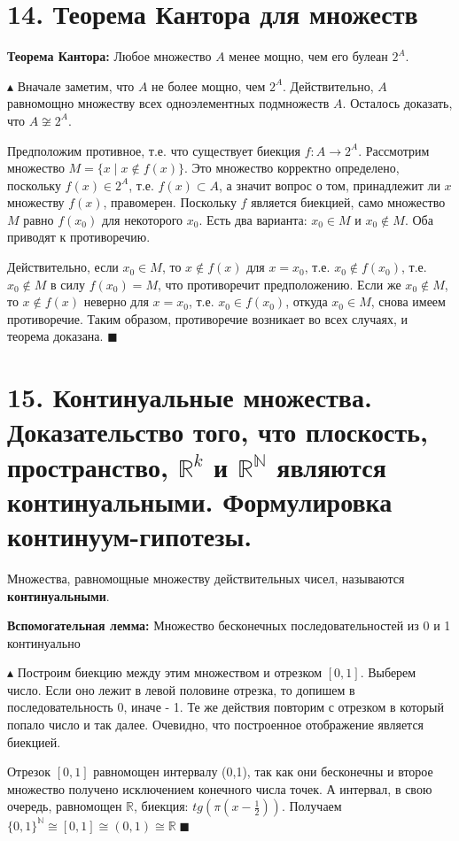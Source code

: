 \section*{14. Теорема Кантора для множеств}
\par \textbf{Теорема Кантора:} Любое множество $A$ менее мощно, чем его булеан $2^A$.
\par $\blacktriangle$ Вначале заметим, что $A$ не более мощно, чем $2^A$. Действительно, $A$ равномощно множеству всех одноэлементных подмножеств $A$. Осталось доказать, что $A \not\cong 2^A$.
\par Предположим противное, т.е. что существует биекция $f : A \rightarrow 2^A$. Рассмотрим множество $M = \{x \; | \; x \not\in f(x)\}$. Это множество корректно определено, поскольку $f(x) \in 2^A$, т.е. $f(x) \subset A$, а значит вопрос о том, принадлежит ли $x$ множеству $f(x)$, правомерен.
Поскольку $f$ является биекцией, само множество $M$ равно $f(x_0)$ для некоторого $x_0$.
Есть два варианта: $x_0 \in M$ и $x_0 \not\in M$. Оба приводят к противоречию.
\par Действительно, если $x_0 \in M$, то $x \not\in f(x)$ для $x = x_0$, т.е. $x_0 \not\in f(x_0)$, т.е. $x_0 \not\in M$ в силу $f(x_0) = M$, что противоречит предположению. Если же $x_0 \not\in M$, то $x \not\in f(x)$
неверно для $x = x_0$, т.е. $x_0 \in f(x_0)$, откуда $x_0 \in M$, снова имеем противоречие. Таким образом, противоречие возникает во всех случаях, и теорема доказана. $\blacksquare$

\section*{15. Континуальные множества. Доказательство того, что плоскость, пространство, $\mathbb{R}^k$ и $\mathbb{R}^{\mathbb{N}}$ являются континуальными. Формулировка \\ континуум-гипотезы.}
\par Множества, равномощные множеству действительных чисел, называются \textbf{континуальными}.
\par \textbf{Вспомогательная лемма: } Множество бесконечных последовательностей из 0 и 1 континуально
\par $\blacktriangle$ Построим биекцию между этим множеством и отрезком $[0,1]$. Выберем число. Если оно лежит в левой половине отрезка, то допишем в последовательность 0, иначе - 1. Те же действия повторим с отрезком в который попало число и так далее. Очевидно, что построенное отображение является биекцией.
\par Отрезок $[0,1]$ равномощен интервалу (0,1), так как они бесконечны и второе множество получено исключением конечного числа точек. А интервал, в свою очередь, равномощен $\mathbb{R}$, биекция: $tg(\pi (x - \frac{1}{2}))$. Получаем $\{0, 1\}^{\mathbb{N}} \cong [0,1] \cong (0,1) \cong \mathbb{R} \; \blacksquare$ 


